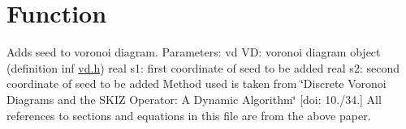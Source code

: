 \hypertarget{group__Function}{}\section{Function}
\label{group__Function}
Adds seed to voronoi diagram. Parameters\+: vd VD\+: voronoi diagram object (definition inf \mbox{\hyperlink{vd_8h_source}{vd.\+h}}) real s1\+: first coordinate of seed to be added real s2\+: second coordinate of seed to be added Method used is taken from \char`\"{}\+Discrete Voronoi Diagrams and the S\+K\+I\+Z
 Operator\+: A Dynamic Algorithm\char`\"{} \mbox{[}doi\+: 10./34.\mbox{]} All references to sections and equations in this file are from the above paper. 